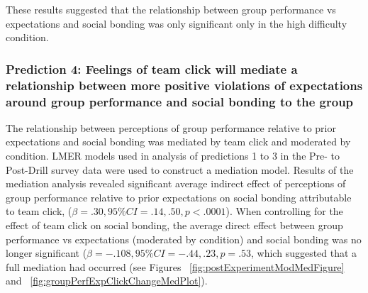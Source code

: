 These results suggested that the relationship between group performance vs expectations and social bonding was only significant only in the high difficulty condition.












\subsubsection{Prediction 4: Feelings of team click will mediate a relationship between more positive violations of expectations around group performance and social bonding to the group}


The relationship between perceptions of group performance relative to prior expectations and social bonding was mediated by team click and moderated by condition.  LMER models used in analysis of predictions 1 to 3 in the Pre- to Post-Drill survey data were used to construct a mediation model.  Results of the mediation analysis revealed significant average indirect effect of perceptions of group performance relative to prior expectations on social bonding attributable to team click, ($\beta = .30, 95\% CI = .14 , .50, p < .0001$).  When controlling for the effect of team click on social bonding, the average direct effect between group performance vs expectations (moderated by condition) and social bonding was no longer significant ($\beta = -.108, 95\% CI = -.44 , .23, p = .53$, which suggested that a full mediation had occurred (see Figures ~\ref{fig:postExperimentModMedFigure} and ~\ref{fig:groupPerfExpClickChangeMedPlot}).

